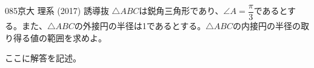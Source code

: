 \begin{prob}{085}{}{京大 理系 (2017) 誘導抜}
 $\triangle{ABC}$は鋭角三角形であり、$\angle{A}=\dfrac{\pi}{3}$であるとする。また、$\triangle{ABC}$の外接円の半径は1であるとする。$\triangle{ABC}$の内接円の半径の取り得る値の範囲を求めよ。
\end{prob}
ここに解答を記述。